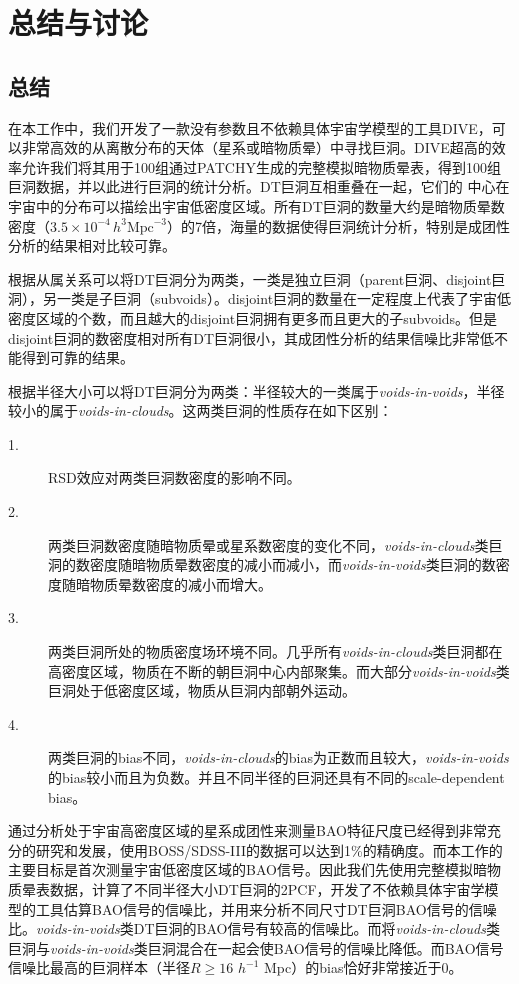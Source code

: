 \chapter{总结与讨论}
\label{cha:summary}

\section{总结}

在本工作中，我们开发了一款没有参数且不依赖具体宇宙学模型的工具DIVE，可以非常高效的从离散分布的天体（星系或暗物质晕）中寻找巨洞。DIVE超高的效率允许我们将其用于100组通过\textsc{PATCHY}生成的完整模拟暗物质晕表，得到100组巨洞数据，并以此进行巨洞的统计分析。DT巨洞互相重叠在一起，它们的 中心在宇宙中的分布可以描绘出宇宙低密度区域。所有DT巨洞的数量大约是暗物质晕数密度（$3.5\times 10^{-4}\,h^3\mathrm{Mpc}^{-3}$）的7倍，海量的数据使得巨洞统计分析，特别是成团性分析的结果相对比较可靠。

根据从属关系可以将DT巨洞分为两类，一类是独立巨洞（parent巨洞、disjoint巨洞），另一类是子巨洞（subvoids）。disjoint巨洞的数量在一定程度上代表了宇宙低密度区域的个数，而且越大的disjoint巨洞拥有更多而且更大的子subvoids。但是disjoint巨洞的数密度相对所有DT巨洞很小，其成团性分析的结果信噪比非常低不能得到可靠的结果。

根据半径大小可以将DT巨洞分为两类：半径较大的一类属于\textit{voids-in-voids}，半径较小的属于\textit{voids-in-clouds}。这两类巨洞的性质存在如下区别：
\begin{description}
\item[1.] RSD效应对两类巨洞数密度的影响不同。
\item[2.] 两类巨洞数密度随暗物质晕或星系数密度的变化不同，\textit{voids-in-clouds}类巨洞的数密度随暗物质晕数密度的减小而减小，而\textit{voids-in-voids}类巨洞的数密度随暗物质晕数密度的减小而增大。
\item[3.] 两类巨洞所处的物质密度场环境不同。几乎所有\textit{voids-in-clouds}类巨洞都在高密度区域，物质在不断的朝巨洞中心内部聚集。而大部分\textit{voids-in-voids}类巨洞处于低密度区域，物质从巨洞内部朝外运动。
\item[4.] 两类巨洞的bias不同，\textit{voids-in-clouds}的bias为正数而且较大，\textit{voids-in-voids}的bias较小而且为负数。并且不同半径的巨洞还具有不同的scale-dependent bias。
\end{description}

通过分析处于宇宙高密度区域的星系成团性来测量BAO特征尺度已经得到非常充分的研究和发展，使用BOSS/SDSS-III的数据可以达到1\%的精确度。而本工作的主要目标是首次测量宇宙低密度区域的BAO信号。因此我们先使用完整模拟暗物质晕表数据，计算了不同半径大小DT巨洞的2PCF，开发了不依赖具体宇宙学模型的工具估算BAO信号的信噪比，并用来分析不同尺寸DT巨洞BAO信号的信噪比。\textit{voids-in-voids}类DT巨洞的BAO信号有较高的信噪比。而将\textit{voids-in-clouds}类巨洞与\textit{voids-in-voids}类巨洞混合在一起会使BAO信号的信噪比降低。而BAO信号信噪比最高的巨洞样本（半径$R \geq 16$ $h^{-1}$ Mpc）的bias恰好非常接近于0。

